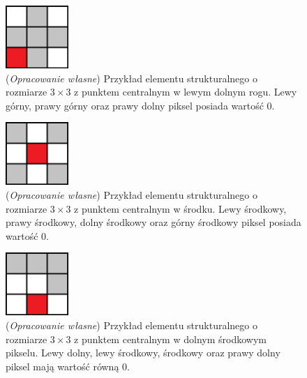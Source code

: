 \documentclass{article}
\begin{document}
        \begin{figure}[H]
            \captionsetup{margin=1.5cm}
            \centering
            \includegraphics[width=90px]{element_strukturalny_3.png}
            \caption
            {
                (\textit{Opracowanie własne}) Przykład elementu strukturalnego o rozmiarze \(3 \times 3\) z punktem centralnym w lewym dolnym rogu.
                Lewy górny, prawy górny oraz prawy dolny piksel posiada wartość 0.
            }
            \label{elst:three}
        \end{figure}

        \begin{figure}[H]
            \captionsetup{margin=1.5cm}
            \centering
            \includegraphics[width=90px]{element_strukturalny_4.png}
            \caption
            {
                (\textit{Opracowanie własne}) Przykład elementu strukturalnego o rozmiarze \(3 \times 3\) z punktem centralnym w środku.
                Lewy środkowy, prawy środkowy, dolny środkowy oraz górny środkowy piksel posiada wartość 0.
            }
            \label{elst:four}
        \end{figure}

        \begin{figure}[H]
            \captionsetup{margin=1.5cm}
            \centering
            \includegraphics[width=90px]{element_strukturalny_5.png}
            \caption
            {
                (\textit{Opracowanie własne}) Przykład elementu strukturalnego o rozmiarze \(3 \times 3\) z punktem centralnym w dolnym środkowym pikselu.
                Lewy dolny, lewy środkowy, środkowy oraz prawy dolny piksel mają wartość równą 0.
            }
            \label{elst:five}
        \end{figure}
\end{document}
